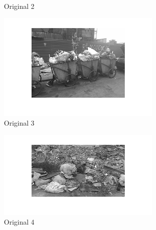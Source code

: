 \begin{center}
\begin{figure}[h]
\begin{subfigure}[b]{0.18\textwidth}
                \caption{Original 2}
                \label{fig:original 2}
        \end{subfigure}%
        \begin{subfigure}[b]{0.18\textwidth}
                \includegraphics[width=\linewidth]{rubbish3.png}
                 \caption{Original 3}
                  \label{fig:original 3}
        \end{subfigure}%
        \begin{subfigure}[b]{0.18\textwidth}
                \includegraphics[width=\linewidth]{rubbish4.png}
                 \caption{Original 4}
                  \label{fig:original 4}
        \end{subfigure}
        \begin{subfigure}[b]{0.18\textwidth}

\end{subfigure}
\end{figure}
\end{center}
